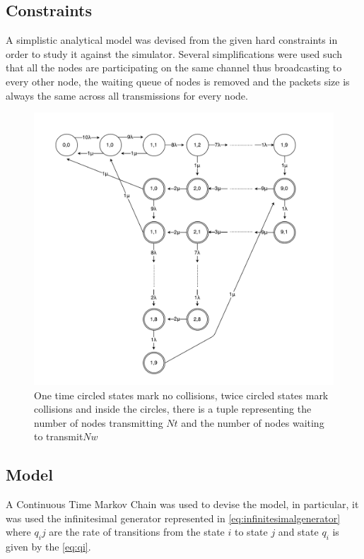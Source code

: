 \documentclass[conference]{IEEEtran}
\begin{document}
\subsection{Constraints}\label{sec:constraints}
A simplistic analytical model was devised from the given hard constraints in order to study it against the simulator. Several simplifications were used such that all the nodes are participating on the same channel thus broadcasting to every other node, the waiting queue of nodes is removed and the packets size is always the same across all transmissions for every node. 

\begin{figure}[t]
    \centering
    \includegraphics[width=\columnwidth]{graphs/MCTS}
    \caption{One time circled states mark no collisions, twice circled states mark collisions and inside the circles, there is a tuple representing the number of nodes transmitting \(Nt\) and the number of nodes waiting to transmit\(Nw\)}
    \label{fig:mcts}
\end{figure}

\subsection{Model}\label{sec:model}
A Continuous Time Markov Chain was used to devise the model, in particular, it was used the infinitesimal generator represented in \cref{eq:infinitesimalgenerator} where \(q_ij\) are the rate of transitions from the state \(i\) to state \(j\) and state \(q_i\) is given by the \cref{eq:qi}.
\end{document}

